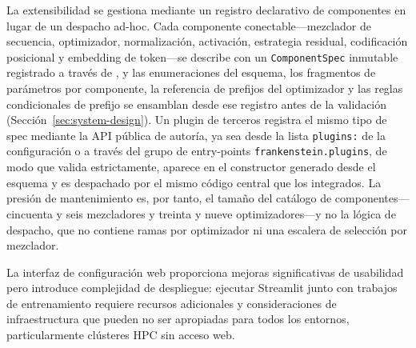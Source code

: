 La extensibilidad se gestiona mediante un registro declarativo de componentes en lugar de un despacho ad-hoc. Cada componente conectable---mezclador de secuencia, optimizador, normalización, activación, estrategia residual, codificación posicional y embedding de token---se describe con un \texttt{ComponentSpec} inmutable registrado a través de , y las enumeraciones del esquema, los fragmentos de parámetros por componente, la referencia de prefijos del optimizador y las reglas condicionales de prefijo se ensamblan desde ese registro antes de la validación (Sección~\ref{sec:system-design}). Un plugin de terceros registra el mismo tipo de spec mediante la API pública de autoría, ya sea desde la lista \texttt{plugins:} de la configuración o a través del grupo de entry-points \texttt{frankenstein.plugins}, de modo que valida estrictamente, aparece en el constructor generado desde el esquema y es despachado por el mismo código central que los integrados. La presión de mantenimiento es, por tanto, el tamaño del catálogo de componentes---cincuenta y seis mezcladores y treinta y nueve optimizadores---y no la lógica de despacho, que no contiene ramas por optimizador ni una escalera de selección por mezclador.

La interfaz de configuración web proporciona mejoras significativas de usabilidad pero introduce complejidad de despliegue: ejecutar Streamlit junto con trabajos de entrenamiento requiere recursos adicionales y consideraciones de infraestructura que pueden no ser apropiadas para todos los entornos, particularmente clústeres HPC sin acceso web.

